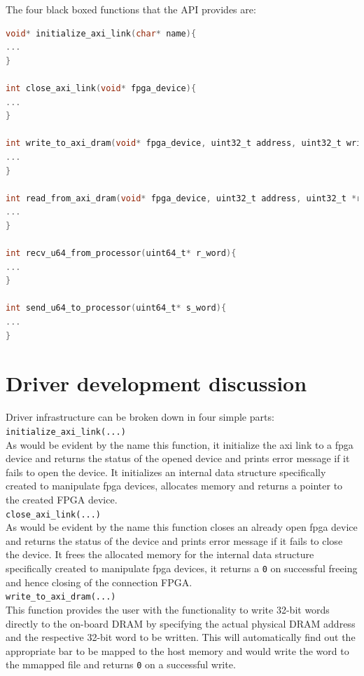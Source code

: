 The four black boxed functions that the API provides are:

\singlespacing
\scriptsize
\begin{lstlisting}[language=C, caption=Driver API]
void* initialize_axi_link(char* name){
...
}

int close_axi_link(void* fpga_device){
...
}

int write_to_axi_dram(void* fpga_device, uint32_t address, uint32_t write_word){
...
}

int read_from_axi_dram(void* fpga_device, uint32_t address, uint32_t *read_word){
...
}

int recv_u64_from_processor(uint64_t* r_word){
...
}

int send_u64_to_processor(uint64_t* s_word){
...
}
\end{lstlisting}
\normalsize
\doublespacing

\section{Driver development discussion}

Driver infrastructure can be broken down in four simple parts:\\

\verb|initialize_axi_link(...)| \\

As would be evident by the name this function, it initialize the axi link to a fpga device and returns the status of the opened device and prints error message if it
fails to open the device. It initializes an internal data structure specifically created to manipulate fpga devices, allocates memory and
returns a pointer to the created FPGA device.\\

\verb|close_axi_link(...)| \\

As would be evident by the name this function closes an already open fpga device and returns the status of the device and prints error
message if it fails to close the device. It frees the allocated memory for the internal data structure specifically created to manipulate
fpga devices, it returns a \verb|0| on successful freeing and hence closing of the connection FPGA.\\

\verb|write_to_axi_dram(...)|\\

This function provides the user with the functionality to write 32-bit words directly to the on-board DRAM by specifying the actual physical
DRAM address and the respective 32-bit word to be written. This will automatically find out the appropriate bar to be mapped to the host
memory and would write the word to the mmapped file and returns \verb|0| on a successful write.\\

